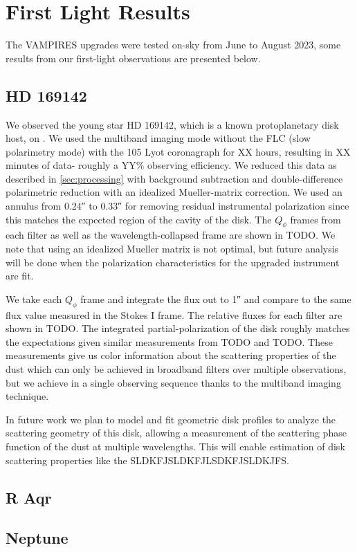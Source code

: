 \section{First Light Results}\label{sec:firstlight}

The VAMPIRES upgrades were tested on-sky from June to August 2023, some results from our first-light observations are presented below.

\subsection{HD 169142\label{sec:hd169142}}

We observed the young star HD 169142, which is a known protoplanetary disk host, on . We used the multiband imaging mode without the FLC (slow polarimetry mode) with the \SI{105}{\mas} Lyot coronagraph for XX hours, resulting in XX minutes of data- roughly a YY\% observing efficiency. We reduced this data as described in \autoref{sec:processing} with background subtraction and double-difference polarimetric reduction with an idealized Mueller-matrix correction. We used an annulus from \ang{;;0.24} to \ang{;;0.33} for removing residual instrumental polarization since this matches the expected region of the cavity of the disk. The $Q_\phi$ frames from each filter as well as the wavelength-collapsed frame are shown in TODO. We note that using an idealized Mueller matrix is not optimal, but future analysis will be done when the polarization characteristics for the upgraded instrument are fit.

We take each $Q_\phi$ frame and integrate the flux out to \ang{;;1} and compare to the same flux value measured in the Stokes I frame. The relative fluxes for each filter are shown in TODO. The integrated partial-polarization of the disk roughly matches the expectations given similar measurements from TODO and TODO. These measurements give us color information about the scattering properties of the dust which can only be achieved in broadband filters over multiple observations, but we achieve in a single observing sequence thanks to the multiband imaging technique.

In future work we plan to model and fit geometric disk profiles to analyze the scattering geometry of this disk, allowing a measurement of the scattering phase function of the dust at multiple wavelengths. This will enable estimation of disk scattering properties like the SLDKFJSLDKFJLSDKFJSLDKJFS.

\subsection{R Aqr\label{sec:raqr}}

\subsection{Neptune\label{sec:neptune}}
